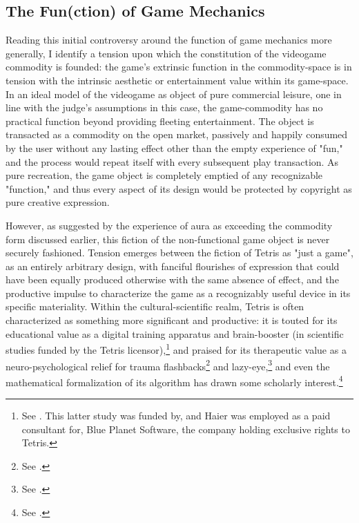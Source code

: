 \subsection*{The Fun(ction) of Game Mechanics}
Reading this initial controversy around the function of game mechanics more generally, I identify a tension upon which the constitution of the videogame commodity is founded: the game's extrinsic function in the commodity-space is in tension with the intrinsic aesthetic or entertainment value within its game-space. In an ideal model of the videogame as object of pure commercial leisure, one in line with the judge's assumptions in this case, the game-commodity has no practical function beyond providing fleeting entertainment. The object is transacted as a commodity on the open market, passively and happily consumed by the user without any lasting effect other than the empty experience of "fun," and the process would repeat itself with every subsequent play transaction. As pure recreation, the game object is completely emptied of any recognizable "function," and thus every aspect of its design would be protected by copyright as pure creative expression.

However, as suggested by the experience of aura as exceeding the commodity form discussed earlier, this fiction of the non-functional game object is never securely fashioned. Tension emerges between the fiction of Tetris as "just a game", as an entirely arbitrary design, with fanciful flourishes of expression that could have been equally produced otherwise with the same absence of effect, and the productive impulse to characterize the game as a recognizably useful device in its specific materiality. Within the cultural-scientific realm, Tetris is often characterized as something more significant and productive: it is touted for its educational value as a digital training apparatus and brain-booster (in scientific studies funded by the Tetris licensor),\footnote{
  See \autocites{Haier1992-vh}{Haier2009-wr}. This latter study was funded by, and Haier was employed as a paid consultant for, Blue Planet Software, the company holding exclusive rights to Tetris.
}
and praised for its therapeutic value as a neuro-psychological relief for trauma flashbacks\footnote{ See \autocites{Holmes2009-ir}.} and lazy-eye,\footnote{ See \autocite{Li2013-cq}.} and even the mathematical formalization of its algorithm has drawn some scholarly interest.\footnote{ See \autocite{Demaine2003}.}

